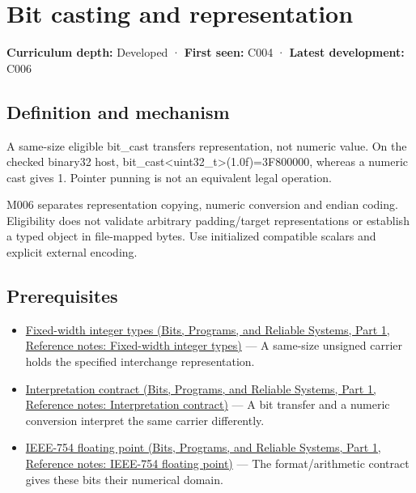 \hypertarget{appendix-34ee45f161c1}{}\label{referencestart:appendix-34ee45f161c1}
\section{Bit casting and representation}\label{appendix-34ee45f161c1-bit-casting-and-representation}

\hypertarget{appendix-34ee45f161c1-bit-casting-and-representation}{}

\textbf{Curriculum depth:} Developed · \textbf{First seen:} C004 · \textbf{Latest development:} C006

\begin{allmightroledefinition}

\subsection{Definition and mechanism}\label{appendix-34ee45f161c1-definition-and-mechanism}

\hypertarget{appendix-34ee45f161c1-definition-and-mechanism}{}

A same-size eligible bit\_cast transfers representation, not numeric value. On the checked binary32 host, bit\_cast\textless uint32\_t\textgreater{}(1.0f)=3F800000, whereas a numeric cast gives 1. Pointer punning is not an equivalent legal operation.

\end{allmightroledefinition}

M006 separates representation copying, numeric conversion and endian coding. Eligibility does not validate arbitrary padding/target representations or establish a typed object in file-mapped bytes. Use initialized compatible scalars and explicit external encoding.

\subsection{Prerequisites}\label{appendix-34ee45f161c1-prerequisites}

\hypertarget{appendix-34ee45f161c1-prerequisites}{}

\begin{itemize}
\tightlist
\item
  \href{../01-Bits-Programs-and-Reliable-Systems-P01/main.pdf\#appendix-cc04044b5782}{Fixed-width integer types (Bits, Programs, and Reliable Systems, Part 1, Reference notes: Fixed-width integer types)} --- A same-size unsigned carrier holds the specified interchange representation.
\item
  \href{../01-Bits-Programs-and-Reliable-Systems-P01/main.pdf\#appendix-f414bd4ed05c}{Interpretation contract (Bits, Programs, and Reliable Systems, Part 1, Reference notes: Interpretation contract)} --- A bit transfer and a numeric conversion interpret the same carrier differently.
\item
  \href{../01-Bits-Programs-and-Reliable-Systems-P01/main.pdf\#appendix-343615f49ddf}{IEEE-754 floating point (Bits, Programs, and Reliable Systems, Part 1, Reference notes: IEEE-754 floating point)} --- The format/arithmetic contract gives these bits their numerical domain.
\end{itemize}

